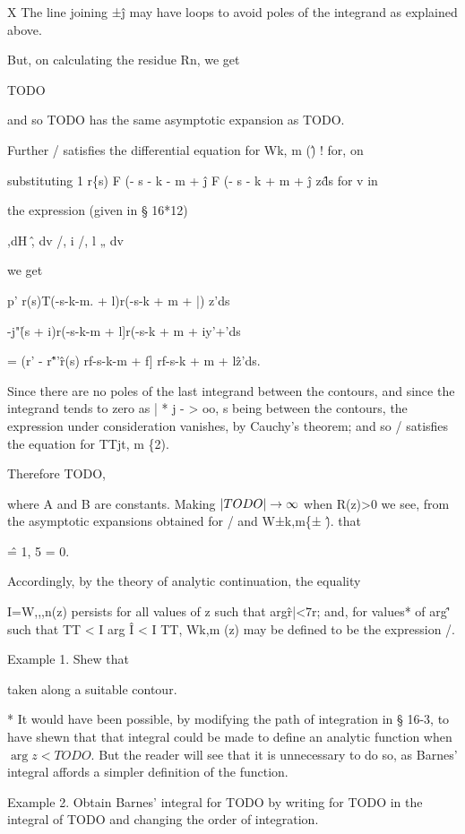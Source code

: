 X The line joining ±\^j may have loops to avoid poles of the integrand
as explained above.

%
%
But, on calculating the residue Rn, we get

TODO

and so TODO has the same asymptotic expansion as TODO.

Further / satisfies the differential equation for Wk, m (\^) ! for, on

substituting 1 r\{s) F (- s - k - m + \^j F (- s - k + m + \^j z\^ds
for v in

the expression (given in § 16*12)

,dH \^, dv /, i /, l „ dv

we get

p' r(s)T(-s-k-m. + l)r(-s-k + m + |) z'ds

-j"\r(s + i)r(-s-k-m + l]r(-s-k + m + iy'+'ds

= (r' - r\^"'\^ r(s) rf-s-k-m + f] rf-s-k + m + l\^z'ds.

Since there are no poles of the last integrand between the contours,
and since the integrand tends to zero as | * j - > oo, s being
between the contours, the expression under consideration vanishes, by
Cauchy's theorem; and so / satisfies the equation for TTjt, m \{2).

Therefore TODO,

where A and B are constants. Making $\left| TODO \right| \rightarrow \infty$
when R(z)>0 we see, from the asymptotic expansions obtained for / and
W±k,m\{± \^). that

\^ = 1, 5 = 0.

Accordingly, by the theory of analytic continuation, the equality

I=W,,,n(z) persists for all values of z such that arg\^r|<7r; and, for
values* of arg\^' such that TT < I arg \^ I < I TT, Wk,m (z) may be
defined to be the expression /.

Example 1. Shew that

taken along a suitable contour.

* It would have been possible, by modifying the path of integration in
§ 16-3, to have shewn that that integral could be made to define an
analytic function when $\arg z < TODO$. But the reader will see that
it is unnecessary to do so, as Barnes' integral affords a simpler
definition of the function.

%
%

Example 2. Obtain Barnes' integral for TODO by writing for TODO in the
integral of TODO and changing the order of integration.

